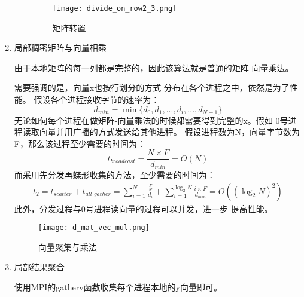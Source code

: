 \documentclass[UTF8,a4paper,12pt]{article}
\begin{document}
\begin{enumerate}[itemindent=0.5em,label=\arabic*、]
\begin{enumerate}
    \begin{figure}[h]
    \begin{center}
    \texttt{[image: divide\_on\_row2\_3.png]} %
    \caption{矩阵转置}
    \end{center}
    \end{figure}
\newpage
  \end{enumerate}
  \item 局部稠密矩阵与向量相乘
  \par 由于本地矩阵的每一列都是完整的，因此该算法就是普通的矩阵-向量乘法。
  \par 需要强调的是，向量x也按行划分的方式
  分布在各个进程之中，依然是为了性能。
  假设各个进程接收字节的速率为：
  \begin{equation}
    d_{min} = \min\{{d_0, d_1, ..., d_i, ..., d_{N-1}\}}
  \end{equation}
  无论如何每个进程在做矩阵-向量乘法的时候都需要得到完整的x。假如
  0号进程读取向量并用广播的方式发送给其他进程。
  假设进程数为N，向量字节数为F，那么该过程至少需要的时间为：
  \begin{equation}
    t_{broadcast} = \frac{N \times F}{d_{min}} = O(N)
  \end{equation}
  而采用先分发再蝶形收集的方法，至少需要的时间为：
  \begin{equation}
    \begin{aligned}
      t_2 = t_{scatter} + t_{all\_gather} =
      \sum_{i=1}^{N}\frac{\frac{F}{N}}{d_i} + \sum_{i=1}^{\log_2N}{\frac{i \times F}{d_{min}}}
      = O((\log_2N)^2)
    \end{aligned}
  \end{equation}
  此外，分发过程与0号进程读向量的过程可以并发，进一步
  提高性能。
  \begin{figure}[h]
  \begin{center}
  \texttt{[image: d\_mat\_vec\_mul.png]} %
  \caption{向量聚集与乘法}
  \end{center}
  \end{figure}

  \item 局部结果聚合
  \par 使用MPI的gatherv函数收集每个进程本地的y向量即可。
\end{enumerate}
\end{document}
